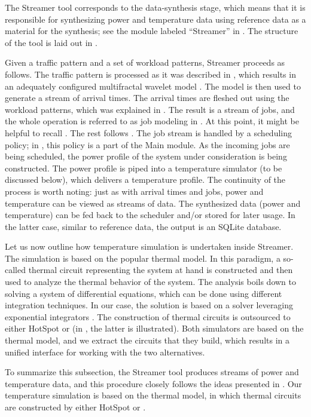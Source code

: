 
The Streamer tool corresponds to the data-synthesis stage, which means that it
is responsible for synthesizing power and temperature data using reference data
as a material for the synthesis; see the module labeled ``Streamer'' in
. The structure of the tool is laid out in .

Given a traffic pattern and a set of workload patterns, Streamer proceeds as
follows. The traffic pattern is processed as it was described in ,
which results in an adequately configured multifractal wavelet model
\cite{riedi1999}. The model is then used to generate a stream of arrival times.
The arrival times are fleshed out using the workload patterns, which was
explained in . The result is a stream of jobs, and the whole
operation is referred to as job modeling in . At this point, it
might be helpful to recall . The rest follows .
The job stream is handled by a scheduling policy; in , this
policy is a part of the Main module. As the incoming jobs are being scheduled,
the power profile of the system under consideration is being constructed. The
power profile is piped into a temperature simulator (to be discussed below),
which delivers a temperature profile. The continuity of the process is worth
noting: just as with arrival times and jobs, power and temperature can be viewed
as streams of data. The synthesized data (power and temperature) can be fed back
to the scheduler and/or stored for later usage. In the latter case, similar to
reference data, the output is an SQLite database.

Let us now outline how temperature simulation is undertaken inside Streamer. The
simulation is based on the popular thermal  model. In this paradigm, a
so-called thermal  circuit representing the system at hand is constructed
and then used to analyze the thermal behavior of the system. The analysis boils
down to solving a system of differential equations, which can be done using
different integration techniques. In our case, the solution is based on a solver
leveraging exponential integrators \cite{hochbruck2010, ukhov2014}. The
construction of thermal circuits is outsourced to either HotSpot
\cite{skadron2004} or  \cite{sridhar2010} (in , the
latter is illustrated). Both simulators are based on the thermal  model,
and we extract the circuits that they build, which results in a unified
interface for working with the two alternatives.

To summarize this subsection, the Streamer tool produces streams of power and
temperature data, and this procedure closely follows the ideas presented in
. Our temperature simulation is based on the thermal 
model, in which thermal circuits are constructed by either HotSpot or
.
